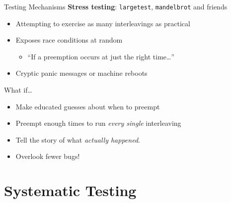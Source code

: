 \documentclass[xcolor=dvipsnames]{beamer}
\begin{document}
\begin{frame}{Testing Mechanisms}
	\textbf{Stress testing}: \texttt{largetest}, \texttt{mandelbrot} and friends
	\begin{itemize}
		\item Attempting to exercise as many interleavings as practical
		\item Exposes race conditions at random
		\begin{itemize}
			\item ``If a preemption occurs at just the right time\ldots''
		\end{itemize}
		\item Cryptic panic messages or machine reboots
	\end{itemize}
	\linegap
	What if\ldots
	\begin{itemize}
		\item Make educated guesses about when to preempt
		\item Preempt enough times to run {\em every single} interleaving
		\item Tell the story of what {\em actually happened}.
		\item Overlook fewer bugs!
	\end{itemize}
\end{frame}


\section{Systematic Testing}

\end{document}
